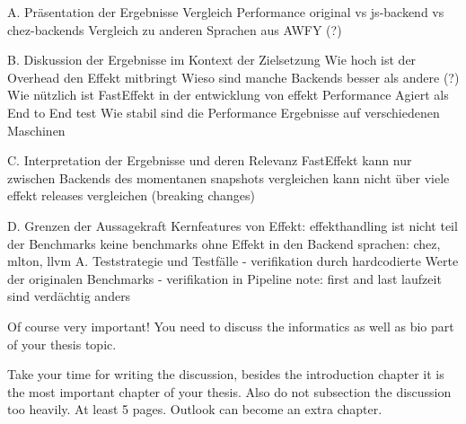 		
A. Präsentation der Ergebnisse
    Vergleich Performance original vs js-backend vs chez-backends
    Vergleich zu anderen Sprachen aus AWFY (?)
    
B. Diskussion der Ergebnisse im Kontext der Zielsetzung
    Wie hoch ist der Overhead den Effekt mitbringt
    Wieso sind manche Backends besser als andere (?)
    Wie nützlich ist FastEffekt in der entwicklung von effekt
        Performance
        Agiert als End to End test
    Wie stabil sind die Performance Ergebnisse auf verschiedenen Maschinen
    
    
C. Interpretation der Ergebnisse und deren Relevanz
    FastEffekt kann nur zwischen Backends des momentanen snapshots vergleichen
    kann nicht über viele effekt releases vergleichen (breaking changes)

D. Grenzen der Aussagekraft
    Kernfeatures von Effekt: effekthandling ist nicht teil der Benchmarks
    keine benchmarks ohne Effekt in den Backend sprachen: chez, mlton, llvm
    A. Teststrategie und Testfälle
        - verifikation durch hardcodierte Werte der originalen Benchmarks
        - verifikation in Pipeline	
        note: first and last laufzeit sind verdächtig anders

Of course very important! You need to discuss the informatics as well as bio part of your thesis topic.

\bigskip
Take your time for writing the discussion, besides the introduction chapter it is the most important chapter of your thesis.
Also do not subsection the discussion too heavily.
At least 5 pages.
Outlook can become an extra chapter.
